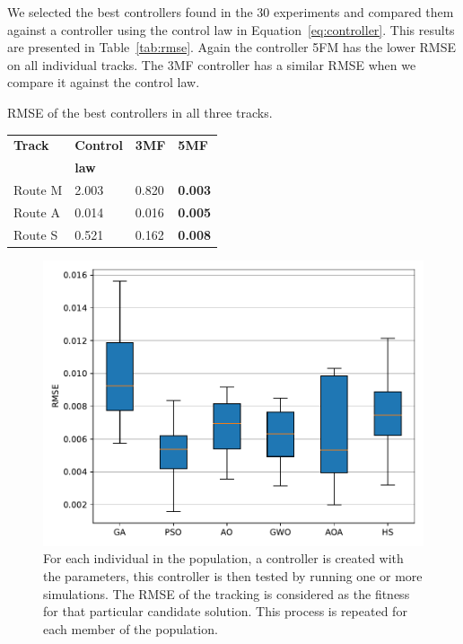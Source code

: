 \documentclass[symmetry,article,submit,moreauthors,pdftex]{Definitions/mdpi}
\begin{document}
We selected the best controllers found in the 30 experiments and compared them
against a controller using the control law in Equation~\ref{eq:controller}.
This results are presented in Table~\ref{tab:rmse}. Again the controller 5FM
has the lower RMSE on all individual tracks. The 3MF controller has a similar
RMSE when we compare it against the control law.

\begin{specialtable}[H] 
\small
\caption{RMSE of the best controllers in all three tracks.}\label{tab:rmse}
\begin{tabular}{llll}
\toprule
\textbf{Track}	& \textbf{Control } &\textbf{3MF}	& \textbf{5MF}\\
	& \textbf{law} & & \\
\midrule
Route M & 2.003 & 0.820 & \textbf{0.003} \\
Route A & 0.014 & 0.016 & \textbf{0.005} \\
Route S & 0.521 & 0.162 & \textbf{0.008} \\
\bottomrule
\end{tabular}
\end{specialtable}

\begin{figure}[H]
\centering
\includegraphics[width=9 cm]{img/boxplot}
\caption{
For each individual in the population, a controller is created with the
parameters, this controller is then tested by running one or more simulations.
The RMSE of the tracking is considered as the fitness for that particular
candidate solution. This process is repeated for each member of the
population.
}\label{fig:boxplot}
\end{figure}
\end{document}
